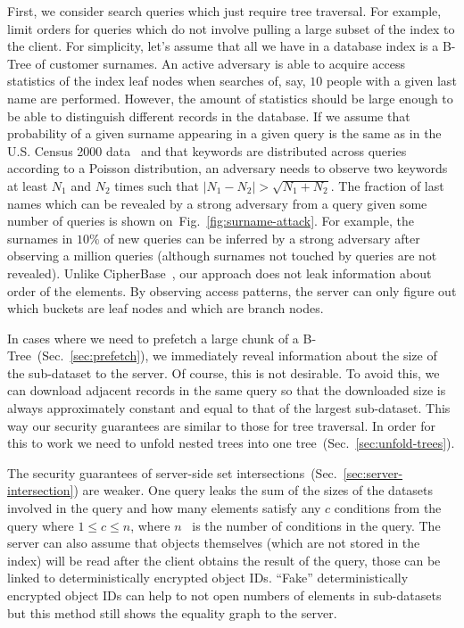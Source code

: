 \documentclass[notitlepage]{revtex4-1}
\newcommand{\figref}[1]{Fig.~\ref{#1}}
\begin{document}
First, we consider search queries which just require tree traversal.
For example, limit orders for queries which do not involve pulling a large subset of the index to the client.
For simplicity, let's assume that all we have in a database index is a B-Tree of customer surnames.
An active adversary is able to acquire access statistics of the index leaf nodes when searches of, say, $10$ people with a given last name are performed.
However, the amount of statistics should be large enough to be able to distinguish different records in the database.
If we assume that probability of a given surname appearing in a given query is the same as in the U.S. Census 2000 data~\cite{us-census-surnames}
and that keywords are distributed across queries according to a Poisson distribution,
an adversary needs to observe two keywords at least $N_1$ and $N_2$ times such that $|N_1 - N_2| > \sqrt{N_1 + N_2}$.
The fraction of last names which can be revealed by a strong adversary from a query given some number of queries is shown on~\figref{fig:surname-attack}.
For example, the surnames in $10\%$ of new queries can be inferred by a strong adversary after observing a million queries (although surnames not touched by queries are not revealed).
Unlike CipherBase~\cite{cipherbase}, our approach does not leak information about order of the elements.
By observing access patterns, the server can only figure out which buckets are leaf nodes and which are branch nodes.

In cases where we need to prefetch a large chunk of a B-Tree~(Sec.~\ref{sec:prefetch}), we immediately reveal information about the size of the sub-dataset to the server.
Of course, this is not desirable.
To avoid this, we can download adjacent records in the same query so that the downloaded size is always approximately constant and equal to that of the largest sub-dataset.
This way our security guarantees are similar to those for tree traversal.
In order for this to work we need to unfold nested trees into one tree~(Sec.~\ref{sec:unfold-trees}).

The security guarantees of server-side set intersections~(Sec.~\ref{sec:server-intersection}) are weaker.
One query leaks the sum of the sizes of the datasets involved in the query and how many elements satisfy any $c$ conditions from the query where $1\le c\le n$, where $n$~ is the number of conditions in the query.
The server can also assume that objects themselves (which are not stored in the index) will be read after the client obtains the result of the query,
those can be linked to deterministically encrypted object IDs.
``Fake'' deterministically encrypted object IDs can help to not open numbers of elements in sub-datasets but this method still shows the equality graph to the server.
\end{document}
